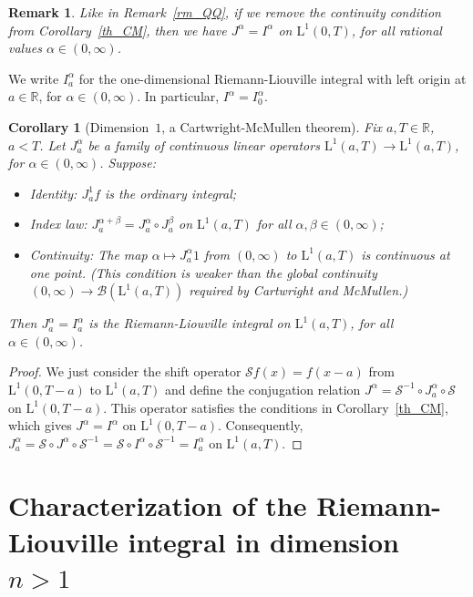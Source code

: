 \documentclass[12pt,reqno]{amsart}
\theoremstyle{plain}
\newtheorem{corollary}[theorem]{Corollary}
\newtheorem{remark}[theorem]{Remark}
\numberwithin{equation}{section} %
\begin{document}
\begin{remark} \normalfont
Like in Remark~\ref{rm_QQ}, if we remove the continuity condition from Corollary~\ref{th_CM}, then we have $J^\alpha=I^\alpha$ on $\mathrm{L}^1(0,T)$, for all rational values $\alpha\in (0,\infty)$.
\end{remark}

We write $I_a^\alpha$ for the one-dimensional Riemann-Liouville integral with left origin at $a\in\mathbb{R}$, for $\alpha\in (0,\infty)$. In particular, $I^\alpha=I_0^\alpha$.

\begin{corollary}[Dimension~$1$, a Cartwright-McMullen theorem] \label{th_CM22111}
Fix $a,T\in\mathbb{R}$, $a<T$. Let $J_a^\alpha$ be a family of continuous linear operators $\mathrm{L}^1(a,T)\rightarrow \mathrm{L}^1(a,T)$, for $\alpha\in (0,\infty)$. Suppose: 
\begin{itemize}
\item Identity: $J_a^1 f$ is the ordinary integral;
\item Index law: $J_a^{\alpha+\beta}=J_a^\alpha\circ J_a^\beta$ on $\mathrm{L}^1(a,T)$ for all $\alpha,\beta\in (0,\infty)$; 
\item Continuity: The map $\alpha\mapsto J_a^{\alpha} 1$ from $(0,\infty)$ to $\mathrm{L}^1(a,T)$ is continuous at one point. (This condition is weaker than the global continuity $(0,\infty)\rightarrow\mathcal{B}(\mathrm{L}^1(a,T))$ required by Cartwright and McMullen.)
\end{itemize}
Then $J_a^\alpha=I_a^\alpha$ is the Riemann-Liouville integral on $\mathrm{L}^1(a,T)$, for all $\alpha\in (0,\infty)$.
\end{corollary}
\begin{proof}
We just consider the shift operator $\mathcal{S}f(x)=f(x-a)$ from $\mathrm{L}^1(0,T-a)$ to $\mathrm{L}^1(a,T)$ and define the conjugation relation $J^{\alpha}=\mathcal{S}^{-1}\circ J_a^\alpha \circ \mathcal{S}$ on $\mathrm{L}^1(0,T-a)$. This operator satisfies the conditions in Corollary~\ref{th_CM}, which gives $J^\alpha=I^\alpha$ on $\mathrm{L}^1(0,T-a)$. Consequently, $J_a^\alpha=\mathcal{S}\circ J^\alpha \circ \mathcal{S}^{-1}=\mathcal{S}\circ I^\alpha \circ \mathcal{S}^{-1}=I_a^\alpha$ on $\mathrm{L}^1(a,T)$.
\end{proof}


\section{Characterization of the Riemann-Liouville integral in dimension $n>1$} \label{seci5}
\end{document}
